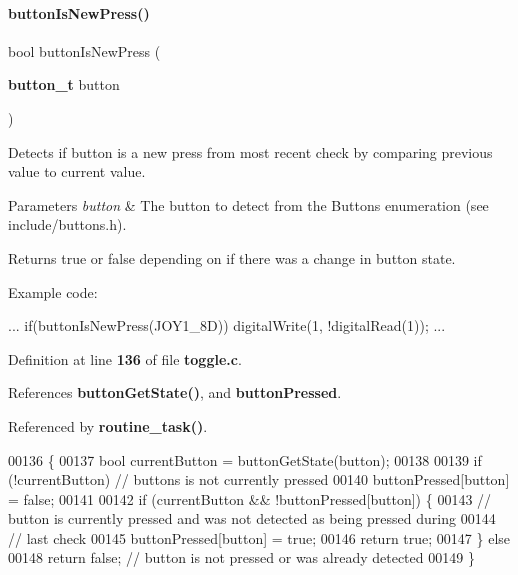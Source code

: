 \paragraph{button\+Is\+New\+Press()}
{\footnotesize\ttfamily bool button\+Is\+New\+Press (\begin{DoxyParamCaption}\item[{\textbf{ button\+\_\+t}}]{button }\end{DoxyParamCaption})}



Detects if button is a new press from most recent check by comparing previous value to current value. 


\begin{DoxyParams}{Parameters}
{\em button} & The button to detect from the Buttons enumeration (see include/buttons.\+h).\\
\hline
\end{DoxyParams}
\begin{DoxyReturn}{Returns}
true or false depending on if there was a change in button state.
\end{DoxyReturn}
Example code\+: 
\begin{DoxyCode}
...
if(buttonIsNewPress(JOY1_8D))
    digitalWrite(1, !digitalRead(1));
...
\end{DoxyCode}
 

Definition at line \textbf{ 136} of file \textbf{ toggle.\+c}.



References \textbf{ button\+Get\+State()}, and \textbf{ button\+Pressed}.



Referenced by \textbf{ routine\+\_\+task()}.


\begin{DoxyCode}
00136                                        \{
00137   \textcolor{keywordtype}{bool} currentButton = buttonGetState(button);
00138 
00139   \textcolor{keywordflow}{if} (!currentButton) \textcolor{comment}{// buttons is not currently pressed}
00140     buttonPressed[button] = \textcolor{keyword}{false};
00141 
00142   \textcolor{keywordflow}{if} (currentButton && !buttonPressed[button]) \{
00143     \textcolor{comment}{// button is currently pressed and was not detected as being pressed during}
00144     \textcolor{comment}{// last check}
00145     buttonPressed[button] = \textcolor{keyword}{true};
00146     \textcolor{keywordflow}{return} \textcolor{keyword}{true};
00147   \} \textcolor{keywordflow}{else}
00148     \textcolor{keywordflow}{return} \textcolor{keyword}{false}; \textcolor{comment}{// button is not pressed or was already detected}
00149 \}
\end{DoxyCode}


